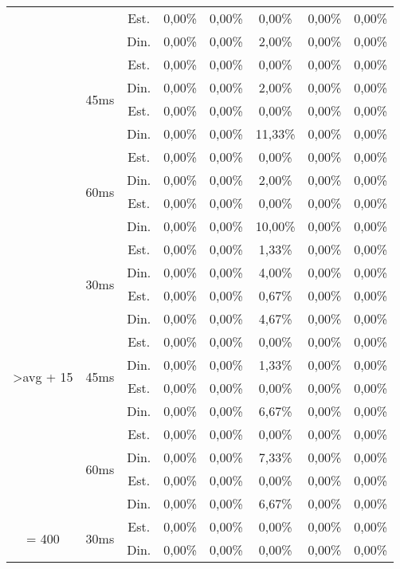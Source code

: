 \begin{center}
\begin{longtable}{|c|c|c|ccccc|}
 &  & Est. & 0,00\% & 0,00\% & 0,00\% & 0,00\% & 0,00\% \\
 &  & Din. & 0,00\% & 0,00\% & 2,00\% & 0,00\% & 0,00\% \\ \cline{2-8} 
 & \multirow{4}{*}{45ms} & Est. & 0,00\% & 0,00\% & 0,00\% & 0,00\% & 0,00\% \\
 &  & Din. & 0,00\% & 0,00\% & 2,00\% & 0,00\% & 0,00\% \\
 &  & Est. & 0,00\% & 0,00\% & 0,00\% & 0,00\% & 0,00\% \\
 &  & Din. & 0,00\% & 0,00\% & 11,33\% & 0,00\% & 0,00\% \\ \cline{2-8} 
 & \multirow{4}{*}{60ms} & Est. & 0,00\% & 0,00\% & 0,00\% & 0,00\% & 0,00\% \\
 &  & Din. & 0,00\% & 0,00\% & 2,00\% & 0,00\% & 0,00\% \\
 &  & Est. & 0,00\% & 0,00\% & 0,00\% & 0,00\% & 0,00\% \\
 &  & Din. & 0,00\% & 0,00\% & 10,00\% & 0,00\% & 0,00\% \\ \hline
\multirow{12}{*}{\textgreater avg + 15} & \multirow{4}{*}{30ms} & Est. & 0,00\% & 0,00\% & 1,33\% & 0,00\% & 0,00\% \\
 &  & Din. & 0,00\% & 0,00\% & 4,00\% & 0,00\% & 0,00\% \\
 &  & Est. & 0,00\% & 0,00\% & 0,67\% & 0,00\% & 0,00\% \\
 &  & Din. & 0,00\% & 0,00\% & 4,67\% & 0,00\% & 0,00\% \\ \cline{2-8} 
 & \multirow{4}{*}{45ms} & Est. & 0,00\% & 0,00\% & 0,00\% & 0,00\% & 0,00\% \\
 &  & Din. & 0,00\% & 0,00\% & 1,33\% & 0,00\% & 0,00\% \\
 &  & Est. & 0,00\% & 0,00\% & 0,00\% & 0,00\% & 0,00\% \\
 &  & Din. & 0,00\% & 0,00\% & 6,67\% & 0,00\% & 0,00\% \\ \cline{2-8} 
 & \multirow{4}{*}{60ms} & Est. & 0,00\% & 0,00\% & 0,00\% & 0,00\% & 0,00\% \\
 &  & Din. & 0,00\% & 0,00\% & 7,33\% & 0,00\% & 0,00\% \\
 &  & Est. & 0,00\% & 0,00\% & 0,00\% & 0,00\% & 0,00\% \\
 &  & Din. & 0,00\% & 0,00\% & 6,67\% & 0,00\% & 0,00\% \\ \hline
\multirow{12}{*}{= 400} & \multirow{4}{*}{30ms} & Est. & 0,00\% & 0,00\% & 0,00\% & 0,00\% & 0,00\% \\
 &  & Din. & 0,00\% & 0,00\% & 0,00\% & 0,00\% & 0,00\% \\

\end{longtable}
\end{center}
